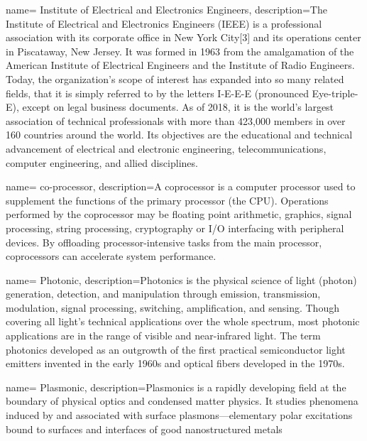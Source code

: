 {
        name= Institute of Electrical and Electronics Engineers,
        description={The Institute of Electrical and Electronics Engineers (IEEE) is a professional association with its corporate office in New York City[3] and its operations center in Piscataway, New Jersey. It was formed in 1963 from the amalgamation of the American Institute of Electrical Engineers and the Institute of Radio Engineers. Today, the organization's scope of interest has expanded into so many related fields, that it is simply referred to by the letters I-E-E-E (pronounced Eye-triple-E), except on legal business documents. As of 2018, it is the world's largest association of technical professionals with more than 423,000 members in over 160 countries around the world. Its objectives are the educational and technical advancement of electrical and electronic engineering, telecommunications, computer engineering, and allied disciplines.}
}

{
        name= co-processor,
        description={A coprocessor is a computer processor used to supplement the functions of the primary processor (the CPU). Operations performed by the coprocessor may be floating point arithmetic, graphics, signal processing, string processing, cryptography or I/O interfacing with peripheral devices. By offloading processor-intensive tasks from the main processor, coprocessors can accelerate system performance.}
}

{
        name= Photonic,
        description={Photonics is the physical science of light (photon) generation, detection, and manipulation through emission, transmission, modulation, signal processing, switching, amplification, and sensing. Though covering all light's technical applications over the whole spectrum, most photonic applications are in the range of visible and near-infrared light. The term photonics developed as an outgrowth of the first practical semiconductor light emitters invented in the early 1960s and optical fibers developed in the 1970s.}
}

{
        name= Plasmonic,
        description={Plasmonics is a rapidly developing field at the boundary of physical optics and condensed matter physics. It studies phenomena induced by and associated with surface plasmons—elementary polar excitations bound to surfaces and interfaces of good nanostructured metals \cite{stockman2018roadmap}}
}

